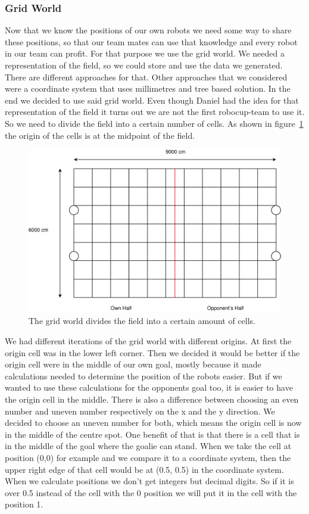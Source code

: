 \documentclass[lnicst,a4paper]{svmultln}
\begin{document}
\subsubsection{Grid World}
Now that we know the positions of our own robots we need some way to share these positions, so that our team mates can use that knowledge and every robot in our team can profit. For that purpose we use the grid world. We needed a representation of the field, so we could store and use the data we generated. There are different approaches for that. Other approaches that we considered were a coordinate system that uses millimetres and tree based solution. In the end we decided to use said grid world. Even though Daniel had the idea for that representation of the field it turns out we are not the first robocup-team to use it. \cite{} So we need to divide the field into a certain number of cells. As shown in figure~\ref{fig:gridworld} the origin of the cells is at the midpoint of the field.
\begin{figure}
 	\centerline{\includegraphics[width=1\textwidth]{gridworld.pdf}}
	{\caption{The grid world divides the field into a certain amount of cells.}\label{fig:gridworld}}
\end{figure}
We had different iterations of the grid world with different origins. At first the origin cell was in the lower left corner. Then we decided it would be better if the origin cell were in the middle of our own goal, mostly because it made calculations needed to determine the position of the robots easier. But if we wanted to use these calculations for the opponents goal too, it is easier to have the origin cell in the middle. There is also a difference between choosing an even number and uneven number respectively on the x and the y direction. We decided to choose an uneven number for both, which means the origin cell is now in the middle of the centre spot. One benefit of that is that there is a cell that is in the middle of the goal where the goalie can stand. When we take the cell at position (0,0) for example and we compare it to a coordinate system, then the upper right edge of that cell would be at (0.5, 0.5) in the coordinate system. When we calculate positions we don't get integers but decimal digits. So if it is over 0.5 instead of the cell with the 0 position we will put it in the cell with the position 1. 
\end{document}
